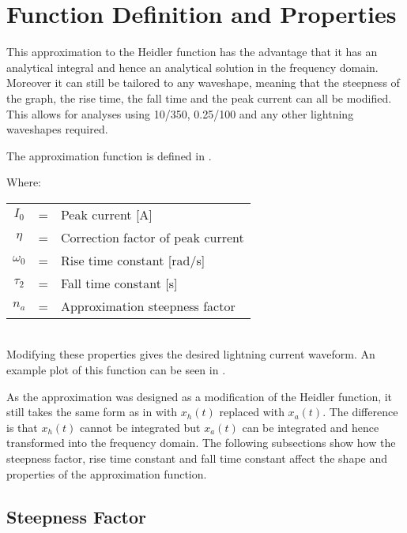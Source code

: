 \section{Function Definition and Properties}
\label{sec:approx_function_definition_and_properties}

This approximation to the Heidler function has the advantage that it has an analytical integral and hence an analytical solution in the frequency domain. Moreover it can still be tailored to any waveshape, meaning that the steepness of the graph, the rise time, the fall time and the peak current can all be modified. This allows for analyses using 10/350, 0.25/100 and any other lightning waveshapes required.

{The approximation function is defined in .

Where: \\
\begin{tabular}{cll}
    $I_0$ & = & Peak current [A] \\
    $\eta$ & = & Correction factor of peak current \\
    $\omega_0$ & = & Rise time constant [rad/s] \\
    $\tau_2$ & = & Fall time constant [s] \\
    $n_a$ & = & Approximation steepness factor
\end{tabular}}\\

Modifying these properties gives the desired lightning current waveform. An example plot of this function can be seen in .

As the approximation was designed as a modification of the Heidler function, it still takes the same form as in  with $x_h \left( t \right)$ replaced with $x_a \left( t \right)$. The difference is that $x_h \left( t \right)$ cannot be integrated but $x_a \left( t \right)$ can be integrated and hence transformed into the frequency domain. The following subsections show how the steepness factor, rise time constant and fall time constant affect the shape and properties of the approximation function.

\subsection{Steepness Factor}
\label{sub:approx_steepness_factor}

